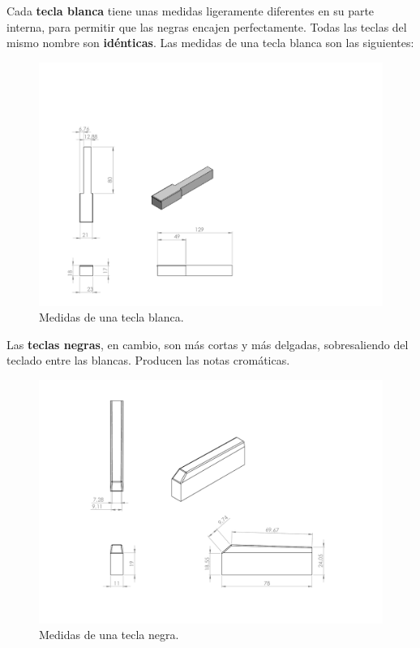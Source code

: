 \smallskip

Cada \textbf{tecla blanca} tiene unas medidas ligeramente diferentes en su parte interna, para permitir que las negras encajen perfectamente. Todas las teclas del mismo nombre son \textbf{idénticas}. Las medidas de una tecla blanca son las siguientes:

\smallskip

\begin{figure}[H]
	\noindent \begin{centering}
		\includegraphics[width=\linewidth*2/3]{capitulo3/blanca_modelo}
		\par\end{centering}
	\smallskip
	\caption{\label{fig:blanca_modelo} Medidas de una tecla blanca.}
\end{figure} 

\smallskip

Las \textbf{teclas negras}, en cambio, son más cortas y más delgadas, sobresaliendo del teclado entre las blancas. Producen las notas cromáticas.

\smallskip

\begin{figure}[H]
	\noindent \begin{centering}
		\includegraphics[width=\linewidth*2/3]{capitulo3/negra_modelo}
		\par\end{centering}
	\smallskip
	\caption{\label{fig:negra_modelo} Medidas de una tecla negra.}
\end{figure} 

